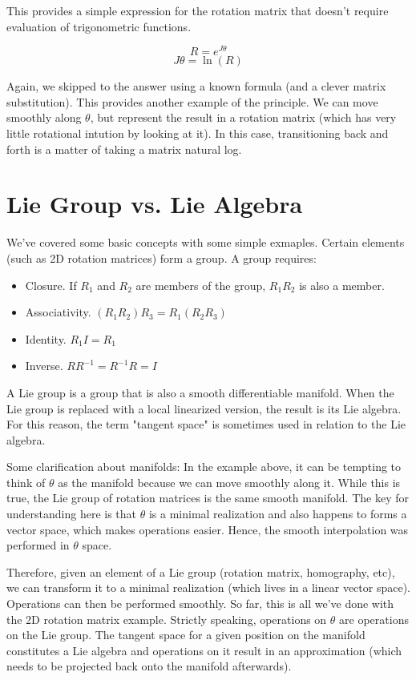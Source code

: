 \documentclass{article}
\begin{document}
  This provides a simple expression for the rotation matrix that doesn't require evaluation of trigonometric functions.

  \begin{equation}
    R = e^{J\theta}
  \end{equation}
  \begin{equation}
    J\theta = \ln(R)
  \end{equation}

  Again, we skipped to the answer using a known formula (and a clever matrix substitution). This provides another example of the principle. We can move smoothly along $\theta$, but represent the result in a rotation matrix (which has very little rotational intution by looking at it). In this case, transitioning back and forth is a matter of taking a matrix natural log.

\section{Lie Group vs. Lie Algebra}
  We've covered some basic concepts with some simple exmaples. Certain elements (such as 2D rotation matrices) form a group. A group requires:
  \begin{itemize}
    \item Closure. If $R_1$ and $R_2$ are members of the group, $R_1R_2$ is also a member.
    \item Associativity. $(R_1R_2)R_3 = R_1(R_2R_3)$
    \item Identity. $R_1I = R_1$
    \item Inverse. $RR^{-1}=R^{-1}R=I$
  \end{itemize}
  A Lie group is a group that is also a smooth differentiable manifold. When the Lie group is replaced with a local linearized version, the result is its Lie algebra. For this reason, the term "tangent space" is sometimes used in relation to the Lie algebra.

  Some clarification about manifolds: In the example above, it can be tempting to think of $\theta$ as the manifold because we can move smoothly along it. While this is true, the Lie group of rotation matrices is the same smooth manifold. The key for understanding here is that $\theta$ is a minimal realization and also happens to forms a vector space, which makes operations easier. Hence, the smooth interpolation was performed in $\theta$ space.

  Therefore, given an element of a Lie group (rotation matrix, homography, etc), we can transform it to a minimal realization (which lives in a linear vector space). Operations can then be performed smoothly. So far, this is all we've done with the 2D rotation matrix example. Strictly speaking, operations on $\theta$ are operations on the Lie group. The tangent space for a given position on the manifold constitutes a Lie algebra and operations on it result in an approximation (which needs to be projected back onto the manifold afterwards).
\end{document}
